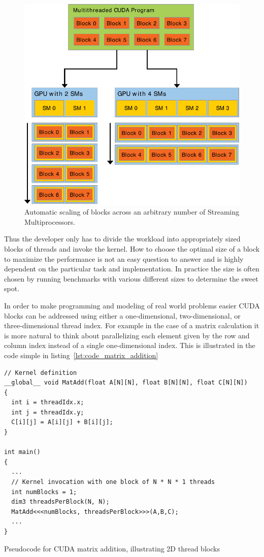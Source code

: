 \documentclass[a4paper,11pt]{kth-mag}
\begin{document}
\begin{figure}
  \centering
  \includegraphics[width=\textwidth]{img/automatic_scaling.pdf}
  \caption{Automatic scaling of blocks across an arbitrary number of Streaming Multiprocessors.}
  \label{fig:automatic_scaling}
\end{figure}

Thus the developer only has to divide the workload into appropriately sized blocks of threads and invoke the kernel. How to choose the optimal size of a block to maximize the performance is not an easy question to answer and is highly dependent on the particular task and implementation. In practice the size is often chosen by running benchmarks with various different sizes to determine the sweet spot.

In order to make programming and modeling of real world problems easier CUDA blocks can be addressed using either a one-dimensional, two-dimensional, or three-dimensional thread index. For example in the case of a matrix calculation it is more natural to think about parallelizing each element given by the row and column index instead of a single one-dimensional index. This is illustrated in the code simple in listing~\ref{lst:code_matrix_addition}

\begin{listing}
  \centering
  \begin{verbatim}
// Kernel definition
__global__ void MatAdd(float A[N][N], float B[N][N], float C[N][N])
{
  int i = threadIdx.x;
  int j = threadIdx.y;
  C[i][j] = A[i][j] + B[i][j];
}

int main()
{
  ...
  // Kernel invocation with one block of N * N * 1 threads
  int numBlocks = 1;
  dim3 threadsPerBlock(N, N);
  MatAdd<<<numBlocks, threadsPerBlock>>>(A,B,C);
  ...
}
  \end{verbatim}
  \caption{Pseudocode for CUDA matrix addition, illustrating 2D thread blocks}
  \label{lst:code_matrix_addition}
\end{listing}
\end{document}
